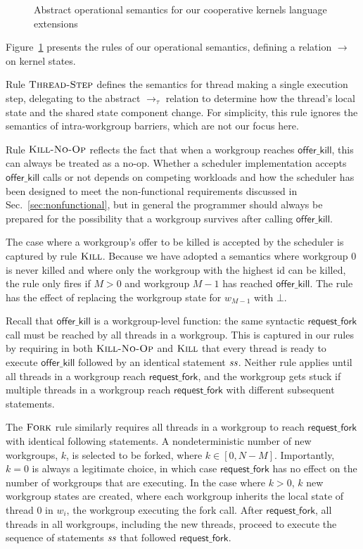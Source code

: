 \documentclass[sigconf]{acmart}
\newcommand{\myfiglong}{Figure~}
\newcommand{\mysec}{Sec.~}
\newcommand{\offerfork}{\mathsf{request\_fork}}
\newcommand{\offerkill}{\mathsf{offer\_kill}}
\begin{document}
{\begin{figure}
\begin{center}
\end{center}

\caption{Abstract operational semantics for our cooperative kernels language extensions}\label{fig:semanticrules}

\end{figure}

%
\myfiglong\ref{fig:semanticrules} presents the rules of our
operational semantics, defining a relation $\rightarrow$ on kernel
states.

Rule $\textsc{Thread-Step}$ defines the semantics for thread making a
single execution step, delegating to the abstract $\rightarrow_{\tau}$
relation to determine how the thread's local state and the shared
state component change.  For simplicity, this rule ignores the
semantics of intra-workgroup barriers, which are not our focus here.

Rule $\textsc{Kill-No-Op}$ reflects the fact that when a workgroup
reaches $\offerkill$, this can always be treated as a no-op.  Whether
a scheduler implementation accepts $\offerkill$ calls or not depends
on competing workloads and how the scheduler has been designed to meet
the non-functional requirements discussed in
\mysec\ref{sec:nonfunctional}, but in general the programmer should
always be prepared for the possibility that a workgroup survives after
calling $\offerkill$.

The case where a workgroup's offer to be killed is accepted by the
scheduler is captured by rule $\textsc{Kill}$.  Because we have
adopted a semantics where workgroup 0 is never killed and where only
the workgroup with the highest id can be killed, the rule only fires
if $M > 0$ and workgroup $M-1$ has reached $\offerkill$.  The rule has
the effect of replacing the workgroup state for $w_{M-1}$
with $\bot$.

Recall that $\offerkill$ is a workgroup-level function: the same
syntactic $\offerfork$ call must be reached by all threads in a
workgroup.  This is captured in our rules by requiring in both
$\textsc{Kill-No-Op}$ and $\textsc{Kill}$ that every thread is ready
to execute $\offerkill$ followed by an identical statement $\mathit{ss}$.
Neither rule applies until all threads in a workgroup reach
$\offerfork$, and the workgroup gets stuck if multiple threads in a
workgroup reach $\offerfork$ with different subsequent statements.

The $\textsc{Fork}$ rule similarly requires all threads in a workgroup
to reach $\offerfork$ with identical following statements.  A
nondeterministic number of new workgroups, $k$, is selected to be
forked, where $k \in [0, N-M]$.  Importantly, $k=0$ is always a
legitimate choice, in which case $\offerfork$ has no effect on the
number of workgroups that are executing.  In the case where $k > 0$,
$k$ new workgroup states are created, where each workgroup inherits
the local state of thread 0 in $w_i$, the workgroup executing the fork
call.  After $\offerfork$, all threads in all workgroups, including
the new threads, proceed to execute the sequence of statements $\mathit{ss}$
that followed $\offerfork$.

}
\end{document}
